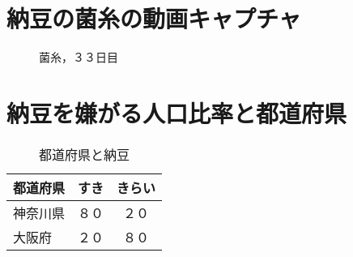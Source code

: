 \appendix

\def\thesection{付録\Alph{section}\\}


\chapter{納豆の菌糸の動画キャプチャ}


\begin{figure}[tb]\centering
\epsfxsize=10cm
\caption{菌糸，３３日目}\label{fig:kinshi33}
\end{figure}

\chapter{納豆を嫌がる人口比率と都道府県}

\begin{table}[tb]\centering
\caption{都道府県と納豆}\label{tab:todoufuken}
\begin{tabular}{lcc}
\hline
都道府県&すき&きらい \\ 
\hline
神奈川県&８０&２０ \\ 
大阪府&２０&８０ \\ 
\hline
\end{tabular}
\end{table}
